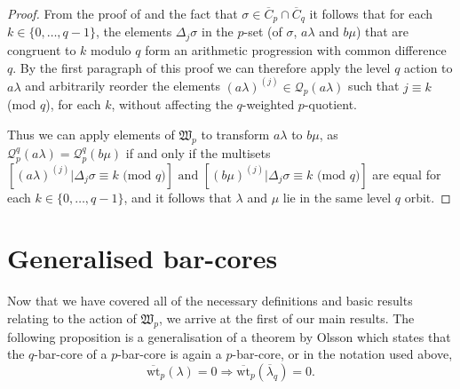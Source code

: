 \documentclass[ALCO, Unicode,published]{cedram}
\begin{document}
\begin{proof}
From the proof of \cite[Proposition 4.1]{F3} and the fact that $\sigma\in\overline{C}_p\cap\overline{C}_q$ it follows that for each $k\in\{0,\dots, q-1\}$, the elements $\Delta_j\sigma$ in the $p$-set (of $\sigma$, $a\lambda$ and $b\mu$) that are congruent to $k$ modulo $q$ form an arithmetic progression with common difference $q$. By the first paragraph of this proof we can therefore apply the level $q$ action to $a\lambda$ and arbitrarily reorder the elements $(a\lambda)^{(j)}\in\mathcal{Q}_p(a\lambda)$ such that $j\equiv k$ (mod $q$), for each $k$, without affecting the $q$-weighted $p$-quotient. 

Thus we can apply elements of $\mathfrak{W}_p$ to transform $a\lambda$ to $b\mu$, as $\mathcal{Q}^q_p(a\lambda)=\mathcal{Q}^q_p(b\mu)$ if and only if the multisets $[(a\lambda)^{(j)}|\Delta_j\sigma\equiv k\text{ (mod }q)]\text{ and }[(b\mu)^{(j)}|\Delta_j\sigma\equiv k\text{ (mod }q)]$ are equal for each $k\in\{0,\dots,q-1\}$, and it follows that $\lambda$ and $\mu$ lie in the same level $q$ orbit. 
\end{proof}

\section{Generalised bar-cores}
 
Now that we have covered all of the necessary definitions and basic results relating to the action of $\mathfrak{W}_p$, we arrive at the first of our main results. The following proposition is a generalisation of a theorem by Olsson \cite[Theorem 4]{O2} which states that the $q$-bar-core of a $p$-bar-core is again a $p$-bar-core, or in the notation used above, 
$$\overline{\text{wt}}_p(\lambda)=0\Rightarrow\overline{\text{wt}}_p(\overline{\lambda}_q)=0.$$ 
\end{document}
